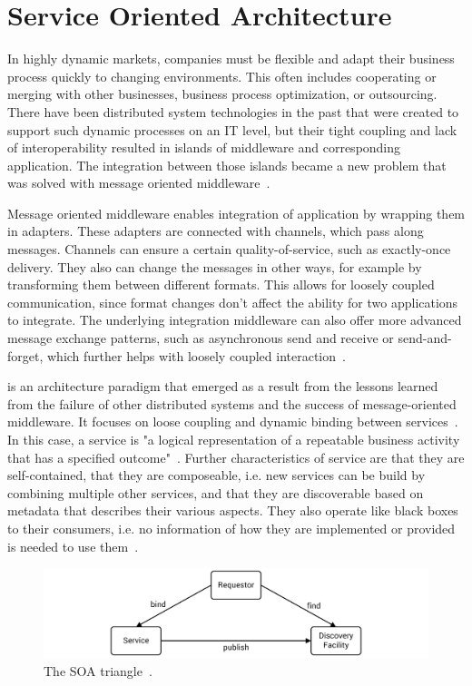\section{Service Oriented Architecture}
\label{fundamentals:service}

In highly dynamic markets, companies must be flexible and adapt their business process quickly to changing environments.
This often includes cooperating or merging with other businesses, business process optimization, or outsourcing.
There have been distributed system technologies in the past that were created to support such dynamic processes on an IT level, but their tight coupling and lack of interoperability resulted in islands of middleware and corresponding application.
The integration between those islands became a new problem that was solved with message oriented middleware~\autocite{webservices}.

Message oriented middleware enables integration of application by wrapping them in adapters.
These adapters are connected with channels, which pass along messages.
Channels can ensure a certain quality-of-service, such as exactly-once delivery.
They also can change the messages in other ways, for example by transforming them between different formats.
This allows for loosely coupled communication, since format changes don't affect the ability for two applications to integrate.
The underlying integration middleware can also offer more advanced message exchange patterns, such as asynchronous send and receive or send-and-forget, which further helps with loosely coupled interaction~\autocite{webservices}.

 is an architecture paradigm that emerged as a result from the lessons learned from the failure of other distributed systems and the success of message-oriented middleware.
It focuses on loose coupling and dynamic binding between services~\autocite{webservices}.
In this case, a service is "a logical representation of a repeatable business activity that has a specified outcome"~\autocite{soa}.
Further characteristics of service are that they are self-contained, that they are composeable, i.e. new services can be build by combining multiple other services, and that they are discoverable based on metadata that describes their various aspects.
They also operate like black boxes to their consumers, i.e. no information of how they are implemented or provided is needed to use them~\autocite{webservices}.

\begin{figure}[!htbp]
	\centering
	\includegraphics[resolution=600]{fundamentals/assets/triangle}
	\caption{The SOA triangle~\autocite[based on][]{webservices}.}
	\label{image:triangle}
\end{figure}

